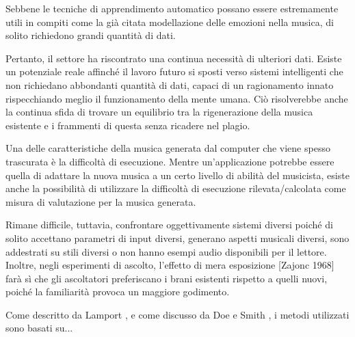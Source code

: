 \documentclass[a4paper,12pt]{report}
\begin{document}
Sebbene le tecniche di apprendimento automatico possano essere estremamente utili in compiti come la già citata modellazione delle emozioni nella musica, di solito richiedono grandi quantità di dati. 

Pertanto, il settore ha riscontrato una continua necessità di ulteriori dati. 
Esiste un potenziale reale affinché il lavoro futuro si sposti verso sistemi intelligenti che non richiedano abbondanti quantità di dati, capaci di un ragionamento innato rispecchiando meglio il funzionamento della mente umana. 
Ciò risolverebbe anche la continua sfida di trovare un equilibrio tra la rigenerazione della musica esistente e i frammenti di questa senza ricadere nel plagio.

Una delle caratteristiche della musica generata dal computer che viene spesso trascurata è la difficoltà di esecuzione. 
Mentre un'applicazione potrebbe essere quella di adattare la nuova musica a un certo livello di abilità del musicista, esiste anche la possibilità di utilizzare la difficoltà di esecuzione rilevata/calcolata come misura di valutazione per la musica generata.

Rimane difficile, tuttavia, confrontare oggettivamente sistemi diversi poiché di solito accettano parametri di input diversi, generano aspetti musicali diversi, sono addestrati su stili diversi o non hanno esempi audio disponibili per il lettore. Inoltre, negli esperimenti di ascolto, l’effetto di mera esposizione [Zajonc 1968] farà sì che gli ascoltatori preferiscano i brani esistenti rispetto a quelli nuovi, poiché la familiarità provoca un maggiore godimento.

Come descritto da Lamport \cite{latex}, e come discusso da Doe e Smith \cite{example_article}, i metodi utilizzati sono basati su...



\end{document}

